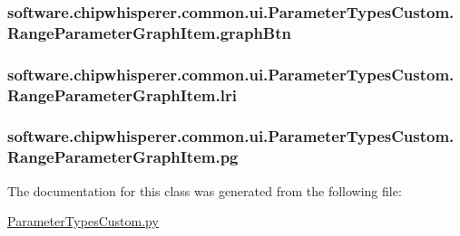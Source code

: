 \subsubsection[{graph\+Btn}]{\setlength{\rightskip}{0pt plus 5cm}software.\+chipwhisperer.\+common.\+ui.\+Parameter\+Types\+Custom.\+Range\+Parameter\+Graph\+Item.\+graph\+Btn}\label{classsoftware_1_1chipwhisperer_1_1common_1_1ui_1_1ParameterTypesCustom_1_1RangeParameterGraphItem_a072d9c3bca88103a46be2ede21a10987}
\hypertarget{classsoftware_1_1chipwhisperer_1_1common_1_1ui_1_1ParameterTypesCustom_1_1RangeParameterGraphItem_a2823b892e982ff00f831bbe0b9dc1b6e}{}
\subsubsection[{lri}]{\setlength{\rightskip}{0pt plus 5cm}software.\+chipwhisperer.\+common.\+ui.\+Parameter\+Types\+Custom.\+Range\+Parameter\+Graph\+Item.\+lri}\label{classsoftware_1_1chipwhisperer_1_1common_1_1ui_1_1ParameterTypesCustom_1_1RangeParameterGraphItem_a2823b892e982ff00f831bbe0b9dc1b6e}
\hypertarget{classsoftware_1_1chipwhisperer_1_1common_1_1ui_1_1ParameterTypesCustom_1_1RangeParameterGraphItem_aa0c25b3ff82fd4aef7c8b7de706f578a}{}
\subsubsection[{pg}]{\setlength{\rightskip}{0pt plus 5cm}software.\+chipwhisperer.\+common.\+ui.\+Parameter\+Types\+Custom.\+Range\+Parameter\+Graph\+Item.\+pg}\label{classsoftware_1_1chipwhisperer_1_1common_1_1ui_1_1ParameterTypesCustom_1_1RangeParameterGraphItem_aa0c25b3ff82fd4aef7c8b7de706f578a}


The documentation for this class was generated from the following file\+:\begin{DoxyCompactItemize}
\item 
\hyperlink{ParameterTypesCustom_8py}{Parameter\+Types\+Custom.\+py}\end{DoxyCompactItemize}
